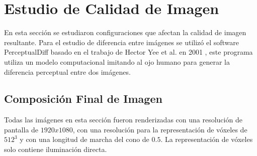 \section{Estudio de Calidad de Imagen}

En esta sección se estudiaron configuraciones que afectan la calidad de imagen resultante. Para el estudio de diferencia entre imágenes se utilizó el software PerceptualDiff basado en el trabajo de Hector Yee et al. en 2001 \cite{Yee:2001:SSV:383745.383748}, este programa utiliza un modelo computacional imitando al ojo humano para generar la diferencia perceptual entre dos imágenes.

\subsection{Composición Final de Imagen}
\label{subsec:final}
Todas las imágenes en esta sección fueron renderizadas con una resolución de pantalla de $1920x1080$, con una resolución para la representación de vóxeles de $512^3$ y con una longitud de marcha del cono de $0.5$. La representación de vóxeles solo contiene iluminación directa.

